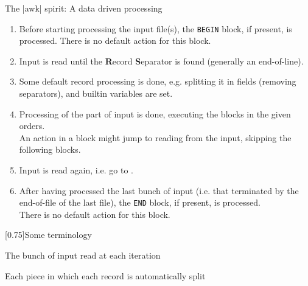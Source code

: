 \begin{frame}{The \bash|awk| spirit: A data driven processing}
    \vspace{-3mm}
    \begin{enumerate}
        \item Before starting processing the input file(s), the \texttt{BEGIN} block, if present, is processed.
              There is no default action for this block.
        \item Input is read until the \textbf{R}ecord \textbf{S}eparator is found (generally an end-of-line).
        \item Some default record processing is done, e.g. splitting it in fields (removing separators), and builtin variables are set.
        \item Processing of the part of input is done, executing the blocks in the given orders.\\
              An action in a block might jump to reading from the input, skipping the following blocks.
        \item Input is read again, i.e. go to .
        \item After having processed the last bunch of input (i.e. that terminated by the end-of-file of the last file), the \texttt{END} block, if present, is processed.\\
              There is no default action for this block.
    \end{enumerate}
    \begin{varblock}{}[0.75\textwidth]{Some terminology}
        \begin{description}
            \item[\textbf{Record:}] The bunch of input read at each iteration
            \item[\textbf{Field:}] Each piece in which each record is automatically split
        \end{description}
    \end{varblock}
\end{frame}
